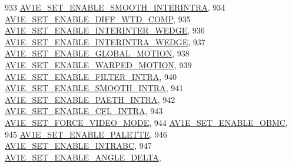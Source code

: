 \begin{DoxyCodeInclude}
{{{{{{{933                                         \hyperlink{group__aom__encoder_ggae78dde67a6d78f332e9bdba0dde42db5aa15748a927789e02f586d2408eaa78fe}{AV1E\_SET\_ENABLE\_SMOOTH\_INTERINTRA},
934                                         \hyperlink{group__aom__encoder_ggae78dde67a6d78f332e9bdba0dde42db5a951b38c88fb632d63568da3cce275ecd}{AV1E\_SET\_ENABLE\_DIFF\_WTD\_COMP},
935                                         \hyperlink{group__aom__encoder_ggae78dde67a6d78f332e9bdba0dde42db5a013aa12c1a51471d2f2f401d6abcb40d}{AV1E\_SET\_ENABLE\_INTERINTER\_WEDGE},
936                                         \hyperlink{group__aom__encoder_ggae78dde67a6d78f332e9bdba0dde42db5a8b3e315575be2741071813f5a3830b79}{AV1E\_SET\_ENABLE\_INTERINTRA\_WEDGE},
937                                         \hyperlink{group__aom__encoder_ggae78dde67a6d78f332e9bdba0dde42db5ad4da3bb77e25bac4a0afc2135617cbd9}{AV1E\_SET\_ENABLE\_GLOBAL\_MOTION},
938                                         \hyperlink{group__aom__encoder_ggae78dde67a6d78f332e9bdba0dde42db5a4c4ae7f4158f795667b16c99fcdc5dd3}{AV1E\_SET\_ENABLE\_WARPED\_MOTION},
939                                         \hyperlink{group__aom__encoder_ggae78dde67a6d78f332e9bdba0dde42db5a9774262de47ffd2bb7d674bb55951a7e}{AV1E\_SET\_ENABLE\_FILTER\_INTRA},
940                                         \hyperlink{group__aom__encoder_ggae78dde67a6d78f332e9bdba0dde42db5a0a1d54150968c5c20b410bc29dc0caa4}{AV1E\_SET\_ENABLE\_SMOOTH\_INTRA},
941                                         \hyperlink{group__aom__encoder_ggae78dde67a6d78f332e9bdba0dde42db5a25f7c646aaec0702964c1fb1bf16e298}{AV1E\_SET\_ENABLE\_PAETH\_INTRA},
942                                         \hyperlink{group__aom__encoder_ggae78dde67a6d78f332e9bdba0dde42db5a993e0e437aa0d152fe654ba0ab46f9d2}{AV1E\_SET\_ENABLE\_CFL\_INTRA},
943                                         \hyperlink{group__aom__encoder_ggae78dde67a6d78f332e9bdba0dde42db5a4fefd9e9d131485429e6c48bd5d439cf}{AV1E\_SET\_FORCE\_VIDEO\_MODE},
944                                         \hyperlink{group__aom__encoder_ggae78dde67a6d78f332e9bdba0dde42db5aa51bc0690a7d51765a01afa015ec2077}{AV1E\_SET\_ENABLE\_OBMC},
945                                         \hyperlink{group__aom__encoder_ggae78dde67a6d78f332e9bdba0dde42db5a98d0e84130317b6c072c2deac106dede}{AV1E\_SET\_ENABLE\_PALETTE},
946                                         \hyperlink{group__aom__encoder_ggae78dde67a6d78f332e9bdba0dde42db5a3e59c51f12c7350fee92c1c0d4901ab0}{AV1E\_SET\_ENABLE\_INTRABC},
947                                         \hyperlink{group__aom__encoder_ggae78dde67a6d78f332e9bdba0dde42db5a3155057080db493c868eb2d42d435b61}{AV1E\_SET\_ENABLE\_ANGLE\_DELTA},
}}}}}}}
\end{DoxyCodeInclude}

